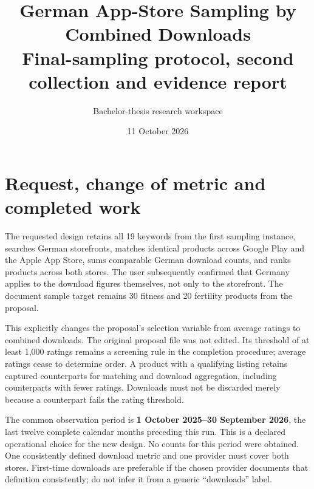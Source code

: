 \documentclass[10pt,a4paper]{article}
\title{\color{studyblue}German App-Store Sampling by Combined Downloads\\
\large Final-sampling protocol, second collection and evidence report}
\author{Bachelor-thesis research workspace}
\date{11 October 2026}
\begin{document}
\maketitle
\begin{center}
\end{center}
\tableofcontents

\section{Request, change of metric and completed work}
The requested design retains all 19 keywords from the first sampling instance,
searches German storefronts, matches identical products across Google Play and the
Apple App Store, sums comparable German download counts, and ranks products across
both stores. The user subsequently confirmed that Germany applies to the download
figures themselves, not only to the storefront. The document sample target remains
30 fitness and 20 fertility products from the proposal.

This explicitly changes the proposal's selection variable from average ratings
to combined downloads. The original proposal file was not edited. Its threshold
of at least 1,000 ratings remains a screening rule in the completion procedure;
average ratings cease to determine order. A product with a qualifying listing
retains captured counterparts for matching and download aggregation, including
counterparts with fewer ratings. Downloads must not be discarded merely because
a counterpart fails the rating threshold.

The common observation period is \textbf{1 October 2025--30 September 2026}, the
last twelve complete calendar months preceding this run. This is a declared
operational choice for the new design. No counts for this period were obtained.
One consistently defined download metric and one provider must cover both stores.
First-time downloads are preferable if the chosen provider documents that
definition consistently; do not infer it from a generic ``downloads'' label.
\end{document}
